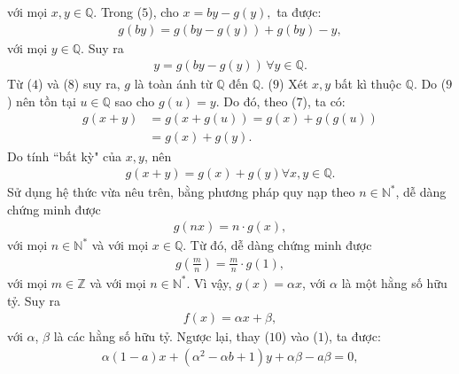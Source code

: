 \begin{multicols}{2}
	với mọi $x,y \in \mathbb{Q}$.
	\vskip 0.05cm
	Trong ($5$), cho $x = by - g\left( y \right),$  ta được:
	\begin{align*}
		g\left( {by} \right) = g\left( {by - g\left( y \right)} \right) + g\left( {by} \right) - y,
	\end{align*}
	với mọi $y \in \mathbb{Q}$. Suy ra
	\begin{align*}
		y = g\left( {by - g\left( y \right)} \right)\,\forall y \in \mathbb{Q}. \tag{$8$}
	\end{align*}
	Từ ($4$) và ($8$) suy ra, $g$ là toàn ánh từ $\mathbb{Q}$ \linebreak đến  $\mathbb{Q}$. \hfill ($9$)
	\vskip 0.05cm
	Xét $x, y$ bất kì thuộc $\mathbb{Q}$.
	\vskip 0.05cm  
	Do ($9$) nên tồn tại $u \in \mathbb{Q}$  sao cho $g(u) = y$. Do đó, theo ($7$), ta có:
	\begin{align*}
		g\left( {x + y} \right) &= g\left( {x + g\left( u \right)} \right) = g\left( x \right) + g\left( {g\left( u \right)} \right) \\
		&= g\left( x \right) + g\left( y \right).
	\end{align*}
	Do tính ``bất kỳ" của $x, y$, nên
	\begin{align*}
		g\left( {x + y} \right) = g\left( x \right) + g\left( y \right)\forall x,y \in \mathbb{Q}.
	\end{align*}
	Sử dụng hệ thức vừa nêu trên, bằng phương pháp quy nạp theo $n \in \mathbb{N^*}$, dễ dàng chứng minh được
	\begin{align*}
		g\left( {nx} \right) = n \cdot g\left( x \right),
	\end{align*}
	với mọi $n \in \mathbb{N^*}$  và với mọi  $x \in \mathbb{Q}$.
	\vskip 0.05cm
	Từ đó, dễ dàng chứng minh được
	\begin{align*}
		g\left( {\frac{m}{n}} \right) = \frac{m}{n} \cdot g\left( 1 \right),
	\end{align*}
	với mọi $m \in \mathbb{Z}$  và với mọi $n \in \mathbb{N^*}$.
	\vskip 0.05cm 
	Vì vậy, $g(x) = \alpha x$,  với $\alpha$  là một hằng số hữu tỷ.
	\vskip 0.05cm
	Suy ra
	\begin{align*}
		f\left( x \right) = \alpha x + \beta , \tag{$10$}
	\end{align*}     
	với $\alpha$, $\beta$  là các hằng số hữu tỷ.
	\vskip 0.05cm
	Ngược lại, thay ($10$) vào ($1$), ta được:
	\begin{align*}
		\alpha \left(\! {1 \!-\! a} \!\right)x \!+\! \left(\! {{\alpha ^2} \!-\! \alpha b \!+\! 1} \right)y \!+\! \alpha \beta  \!-\! a\beta  \!=\! 0, 

\end{align*}
\end{multicols}
